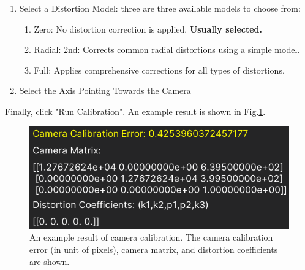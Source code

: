 \documentclass[a4paper,fleqn]{article}
\begin{document}
\begin{enumerate}
\begin{enumerate}
\begin{enumerate}
            \item Select a Distortion Model: three are three available models to choose from:
            \begin{enumerate}
                \item Zero: No distortion correction is applied. \textbf{Usually selected.}

                \item Radial: 2nd: Corrects common radial distortions using a simple model.

                \item Full: Applies comprehensive corrections for all types of distortions.
            \end{enumerate}
            
            \item Select the Axis Pointing Towards the Camera
        \end{enumerate}

        Finally, click "Run Calibration". An example result is shown in Fig.\ref{fig:GUI_pinhole_camcalib}.
            \begin{figure}[h]
                \centering
                \includegraphics[width=0.8\linewidth]{Fig/GUI_pinhole_camcalib.png}
                \caption{An example result of camera calibration. The camera calibration error (in unit of pixels), camera matrix, and distortion coefficients are shown.}
                \label{fig:GUI_pinhole_camcalib}
            \end{figure}
        

\end{enumerate}
\end{enumerate}
\end{document}
